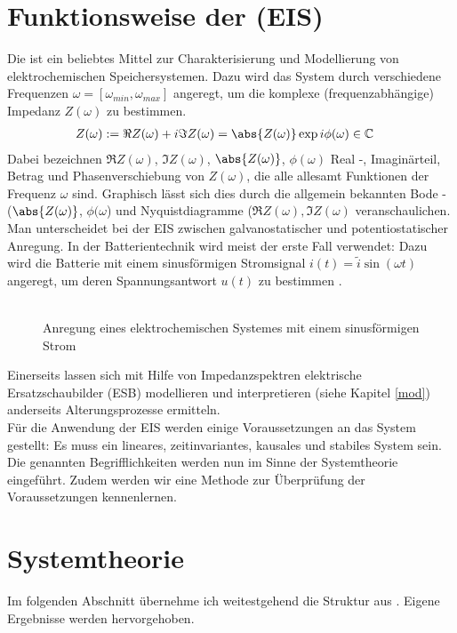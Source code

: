\section{Funktionsweise der \eis (EIS)}\label{sys:eis}
Die \eis ist ein beliebtes Mittel zur Charakterisierung und Modellierung von elektrochemischen Speichersystemen. Dazu wird das System durch verschiedene Frequenzen $\omega = [\omega_{min}, \omega_{max}]$ angeregt, um die komplexe (frequenzabhängige) Impedanz $Z(\omega)$ zu bestimmen.
\begin{align}
	Z(\omega)&:= \Re{Z(\omega)} + i \Im{Z(\omega)} = \abs{Z(\omega)} \exp{i \phi(\omega)} \in \mathbb{C}
\end{align}  
Dabei bezeichnen $\Re{Z(\omega)}$, $\Im{Z(\omega)}$, $\abs{Z(\omega)}$, $\phi(\omega)$ Real -, Imaginärteil, Betrag und Phasenverschiebung von $Z(\omega)$, die alle allesamt Funktionen der Frequenz $\omega$ sind. Graphisch lässt sich dies durch die allgemein bekannten Bode - ($\abs{Z(\omega)}$, $\phi(\omega$) und Nyquistdiagramme ($\Re{Z(\omega)}, \Im{Z(\omega)}$  veranschaulichen. Man unterscheidet bei der EIS zwischen galvanostatischer und potentiostatischer Anregung. In der Batterientechnik wird meist der erste Fall verwendet: Dazu wird die Batterie mit einem sinusförmigen Stromsignal $i(t) = \tilde{i} \sin(\omega t)$ angeregt, um deren Spannungsantwort $u(t)$ zu bestimmen \cite{DambrowskiLade}.\\\\
\begin{figure}
	\centering
	\def\svgwidth{0.90\columnwidth}
	
	\caption{Anregung eines elektrochemischen Systemes mit einem sinusförmigen Strom}
	\label{fig:eis}
\end{figure}
Einerseits lassen sich mit Hilfe von Impedanzspektren elektrische Ersatzschaubilder (ESB) modellieren und interpretieren (siehe Kapitel \ref{mod}) anderseits  Alterungsprozesse ermitteln.\\
Für die Anwendung der EIS werden einige Voraussetzungen an das System gestellt: Es muss ein lineares, zeitinvariantes, kausales und stabiles System sein. Die genannten Begrifflichkeiten werden nun im Sinne der Systemtheorie eingeführt. Zudem werden wir eine Methode zur Überprüfung der Voraussetzungen kennenlernen.

\section{Systemtheorie}\label{sys}
Im folgenden Abschnitt übernehme ich weitestgehend die Struktur aus \cite{Dambrowski2013}. Eigene Ergebnisse werden hervorgehoben. 
